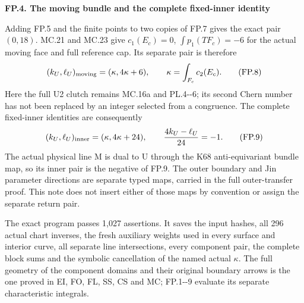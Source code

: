 \par

\medskip\noindent\textbf{FP.4. The moving bundle and the complete fixed-inner identity}

\par\nobreak

Adding FP.5 and the finite points to two copies of
FP.7 gives the exact pair \((0,18)\). MC.21 and
MC.23 give \(c_1(E_c)=0\), \(\int p_1(TF_c)=-6\)
for the actual moving face and full reference cap.
Its separate pair is therefore
\[
 (k_U,\ell_U)_{\rm moving}=(\kappa,4\kappa+6),
 \qquad \kappa=\int_{F_c}c_2(E_c).                     \tag{FP.8}
\]
Here the full U2 clutch remains MC.16a and PL.4-\/-6;
its second Chern number has not been replaced by
an integer selected from a congruence. The complete
fixed-inner identities are consequently
\[
 (k_U,\ell_U)_{\rm inner}=(\kappa,4\kappa+24),
 \qquad \frac{4k_U-\ell_U}{24}=-1.                     \tag{FP.9}
\]
The actual physical line M is dual to U through
the K68 anti-equivariant bundle map, so its inner
pair is the negative of FP.9. The outer boundary
and Jin parameter directions are separate typed
maps, carried in the full outer-transfer proof.
This note does not insert either of those maps
by convention or assign the separate return pair.

The exact program
passes 1,027 assertions. It saves the input hashes,
all 296 actual chart inverses, the fresh auxiliary
weights used in every surface and interior curve,
all separate line intersections, every component
pair, the complete block sums and the symbolic
cancellation of the named actual \(\kappa\).
The full geometry of the component domains and
their original boundary arrows is the one proved
in EI, FO, FL, SS, CS and MC; FP.1-\/-9 evaluate
its separate characteristic integrals.

